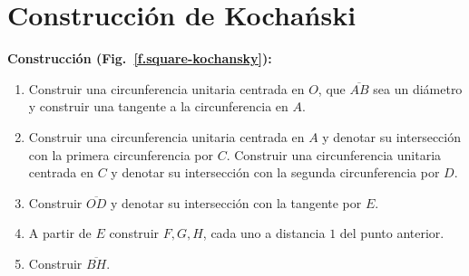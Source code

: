 


\section{Construcción de Kocha\'{n}ski}\label{s.square-kochanski}
\textbf{Construcción (Fig.~\ref{f.square-kochansky}):}
\begin{enumerate}
\item Construir una circunferencia unitaria centrada en $O$, que $\overline{AB}$ sea un diámetro y construir una tangente a la circunferencia en $A$.
\item Construir una circunferencia unitaria centrada en $A$ y denotar su intersección con la primera circunferencia por $C$. Construir una circunferencia unitaria centrada en $C$ y denotar su intersección con la segunda circunferencia por $D$. 
\item Construir $\overline{OD}$ y denotar su intersección con la tangente por $E$.
\item A partir de $E$ construir $F,G,H$, cada uno a distancia $1$ del punto anterior.
\item Construir $\overline{BH}$.
\end{enumerate}

